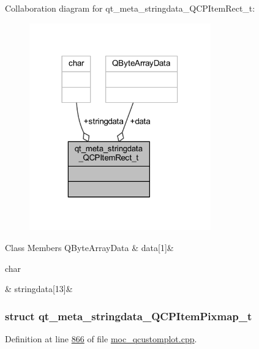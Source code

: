 Collaboration diagram for qt\+\_\+meta\+\_\+stringdata\+\_\+\+Q\+C\+P\+Item\+Rect\+\_\+t\+:
\nopagebreak
\begin{figure}[H]
\begin{center}
\leavevmode
\includegraphics[width=222pt]{d5/de9/a00176}
\end{center}
\end{figure}
\begin{DoxyFields}{Class Members}
\hypertarget{a00016_abb87c72758ddd18aa3c36a7ee960fa1f}{Q\+Byte\+Array\+Data}\label{a00016_abb87c72758ddd18aa3c36a7ee960fa1f}
&
data\mbox{[}1\mbox{]}&
\\
\hline

\hypertarget{a00016_a8006d9df79f24f9dc9846ce4485c145a}{char}\label{a00016_a8006d9df79f24f9dc9846ce4485c145a}
&
stringdata\mbox{[}13\mbox{]}&
\\
\hline

\end{DoxyFields}
\label{dd/d42/a00109}
\hypertarget{a00016_dd/d42/a00109}{}
\subsubsection{struct qt\+\_\+meta\+\_\+stringdata\+\_\+\+Q\+C\+P\+Item\+Pixmap\+\_\+t}


Definition at line \hyperlink{a00016_source_l00866}{866} of file \hyperlink{a00016_source}{moc\+\_\+qcustomplot.\+cpp}.



